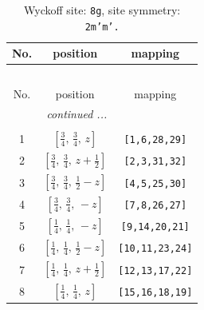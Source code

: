 \documentclass[fleqn,8pt]{jsarticle}
\begin{document}
\renewcommand{\arraystretch}{1.2}
\begin{longtable}{ccc}
\caption{Wyckoff site: {\tt 8g}, site symmetry: {\tt 2m'm'.}}
 \\
 \hline \hline
No. & position & mapping \\ \hline \endfirsthead

\multicolumn{2}{l}{\tablename\ \thetable{}} \\
 \hline \hline
No. & position & mapping \\ \hline \endhead

 \hline \hline
\multicolumn{2}{r}{\footnotesize\it continued ...} \\ \endfoot

 \hline \hline
\multicolumn{2}{r}{} \\ \endlastfoot

1 & $\left[ \frac{3}{4},\, \frac{3}{4},\, z \right]$ & {\tt [1,6,28,29]} \\ \hline
2 & $\left[ \frac{3}{4},\, \frac{3}{4},\, z + \frac{1}{2} \right]$ & {\tt [2,3,31,32]} \\ \hline
3 & $\left[ \frac{3}{4},\, \frac{3}{4},\, \frac{1}{2} - z \right]$ & {\tt [4,5,25,30]} \\ \hline
4 & $\left[ \frac{3}{4},\, \frac{3}{4},\, - z \right]$ & {\tt [7,8,26,27]} \\ \hline
5 & $\left[ \frac{1}{4},\, \frac{1}{4},\, - z \right]$ & {\tt [9,14,20,21]} \\ \hline
6 & $\left[ \frac{1}{4},\, \frac{1}{4},\, \frac{1}{2} - z \right]$ & {\tt [10,11,23,24]} \\ \hline
7 & $\left[ \frac{1}{4},\, \frac{1}{4},\, z + \frac{1}{2} \right]$ & {\tt [12,13,17,22]} \\ \hline
8 & $\left[ \frac{1}{4},\, \frac{1}{4},\, z \right]$ & {\tt [15,16,18,19]} \\
\end{longtable}
\renewcommand{\arraystretch}{1.2}
\end{document}
